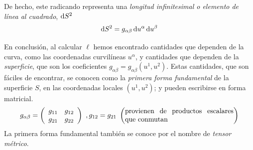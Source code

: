 De hecho, este radicando representa una \emph{longitud infinitesimal o elemento de línea al cuadrado}, $\odif{S^2}$
$$
\odif{S^2}=g_{\alpha\beta}\odif{u^\alpha}\odif{u^\beta}
$$

En conclusión, al calcular $\ell $ hemos encontrado cantidades que dependen de la curva, como las coordenadas curvilíneas $u^\alpha$, y cantidades que dependen de la \emph{superficie}, que son los coeficientes $g_{\alpha\beta}=g_{\alpha\beta}(u^1,u^2)$. Estas cantidades, que son fáciles de encontrar, se conocen como la \emph{primera forma fundamental} de la superficie $S$, en las coordenadas locales $(u^1,u^2)$; y pueden escribirse en forma matricial.
$$
g_{\alpha\beta}=\left (\begin{array}{cc}
     g_{11}&g_{12}  \\
     g_{21}&g_{22} 
\end{array}\right ) \ ,  g_{12}=g_{21} \ \left (\text{\parbox{5.5cm}{provienen de productos escalares que conmutan}}\right )
$$
La primera forma fundamental también se conoce por el nombre de \emph{tensor métrico}.\\
